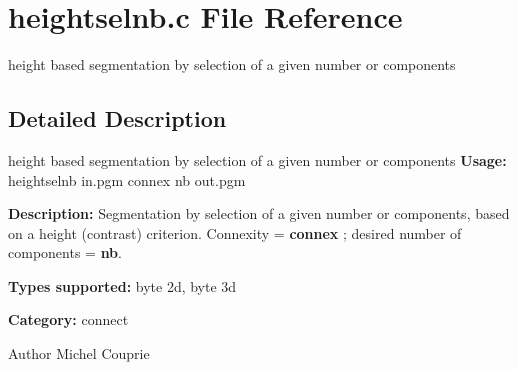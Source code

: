 \section{heightselnb.c File Reference}
\label{heightselnb_8c}


height based segmentation by selection of a given number or components  




\subsection{Detailed Description}
height based segmentation by selection of a given number or components {\bfseries Usage:} heightselnb in.pgm connex nb out.pgm

{\bfseries Description:} Segmentation by selection of a given number or components, based on a height (contrast) criterion. Connexity = {\bfseries connex} ; desired number of components = {\bfseries nb}.

{\bfseries Types supported:} byte 2d, byte 3d

{\bfseries Category:} connect

\begin{DoxyAuthor}{Author}
Michel Couprie 
\end{DoxyAuthor}
